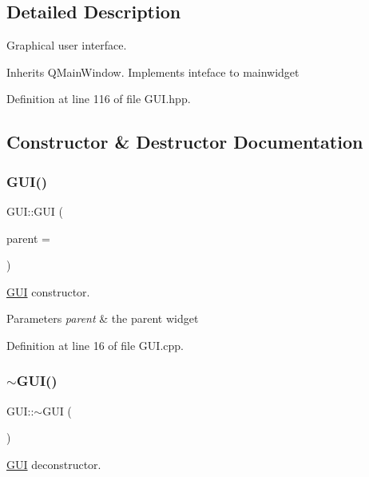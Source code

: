 \subsection{Detailed Description}
Graphical user interface. 

Inherits Q\+Main\+Window. Implements inteface to mainwidget 

Definition at line 116 of file G\+U\+I.\+hpp.



\subsection{Constructor \& Destructor Documentation}
\mbox{\label{classGUI_acb0ba8c6fc121d814d30560e2c29f2fe}} 
\subsubsection{\texorpdfstring{G\+U\+I()}{GUI()}}
{\footnotesize\ttfamily G\+U\+I\+::\+G\+UI (\begin{DoxyParamCaption}\item[{Q\+Widget $\ast$}]{parent = {} }\end{DoxyParamCaption})}



\mbox{\hyperlink{classGUI}{G\+UI}} constructor. 


\begin{DoxyParams}{Parameters}
{\em parent} & the parent widget \\
\hline
\end{DoxyParams}


Definition at line 16 of file G\+U\+I.\+cpp.

\mbox{\label{classGUI_ac9cae2328dcb5d83bdfaeca49a2eb695}} 
\subsubsection{\texorpdfstring{$\sim$\+G\+U\+I()}{~GUI()}}
{\footnotesize\ttfamily G\+U\+I\+::$\sim$\+G\+UI (\begin{DoxyParamCaption}{ }\end{DoxyParamCaption})}



\mbox{\hyperlink{classGUI}{G\+UI}} deconstructor. 

